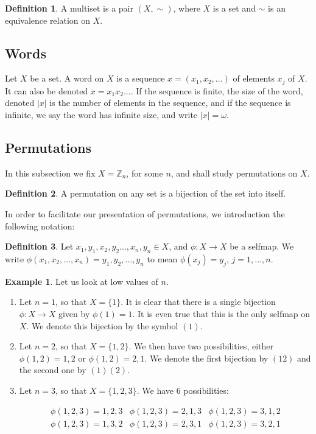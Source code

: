 \documentclass[]{article}
\theoremstyle{definition}
\newtheorem{definition}{Definition}[section]
\theoremstyle{definition}
\newtheorem{exmp}{Example}[section]
\newcommand{\raw}{\rightarrow}
\newcommand{\bb}{\mathbb}
\begin{document}
	\begin{definition}
		A multiset is a pair $(X, \sim)$, where $X$ is a set and $\sim$ is an equivalence relation on $X$.
	\end{definition}
	
	\subsection{Words}
	
	Let $X$ be a set. A word on $X$ is a sequence $x = (x_1, x_2, ...)$ of elements $x_j$ of $X$. It can also be denoted $x=x_1x_2...$. If the sequence is finite, the size of the word, denoted $|x|$ is the number of elements in the sequence, and if the sequence is infinite, we say the word has infinite size, and write $|x| = \omega$.
	
	
	
	\subsection{Permutations}
	
	In this subsection we fix $X = \bb{Z}_n$, for some $n$, and shall study permutations on $X$. 
	
	\begin{definition}
		A permutation on any set is a bijection of the set into itself.
	\end{definition}
	
	In order to facilitate our presentation of permutations, we introduction the following notation:
	
	\begin{definition}
		Let $x_1, y_1, x_2, y_2. .., x_n, y_n \in X$, and $\phi:X\raw X$ be a selfmap. We write $\phi(x_1, x_2, ..., x_n) = y_1,y_2, ..., y_n$ to mean $\phi(x_j) = y_j$, $j=1,...,n$.
	\end{definition}
	
	\begin{exmp}
		Let us look at low values of $n$.
		
		\begin{enumerate}
			\item 	Let $n=1$, so that $X = \{1\}$. It is clear that there is a single bijection $\phi: X \raw X$ given by $\phi(1)=1$. It is even true that this is the only selfmap on $X$. We denote this bijection by the symbol $(1)$.
			
			\item Let $n=2$, so that $X = \{1,2 \}$. We then have two possibilities, either $\phi(1,2)=1,2$ or $\phi(1,2)=2,1$. We denote the first bijection by $(12)$ and the second one by $(1)(2)$.
			
			\item Let $n=3$, so that $X = \{1,2, 3 \}$. We have 6 possibilities:
			
			$$\begin{array}{ccc}
			\phi(1,2,3)=1,2,3	& \phi(1,2,3)= 2,1,3 & \phi(1,2,3)= 3,1,2 \\ 
			\phi(1,2,3)= 1,3,2 & \phi(1,2,3)= 2,3,1 & \phi(1,2,3)= 3,2,1
			\end{array}$$ 
		\end{enumerate}
	\end{exmp}
	
\end{document}
